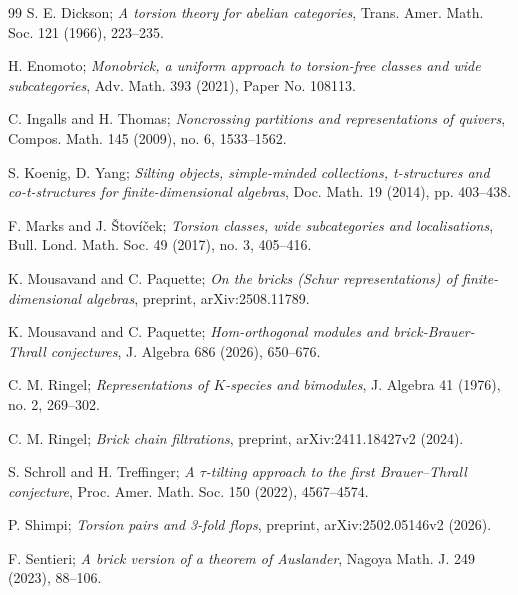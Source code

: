 \documentclass[11pt]{amsart}
\theoremstyle{definition}
\begin{document}
\begin{thebibliography}{99}
S. E. Dickson;
\emph{A torsion theory for abelian categories},
Trans. Amer. Math. Soc. 121 (1966), 223--235.


H. Enomoto;
\emph{Monobrick, a uniform approach to torsion-free classes and wide subcategories},
Adv. Math. 393 (2021), Paper No. 108113.

C. Ingalls and H. Thomas;
\emph{Noncrossing partitions and representations of quivers},
Compos. Math. 145 (2009), no. 6, 1533--1562.

S. Koenig, D. Yang; 
\emph{Silting objects, simple-minded collections, t-structures and co-t-structures for finite-dimensional algebras},
Doc. Math. 19 (2014), pp. 403--438.

F. Marks and J. \v{S}tov\'{i}\v{c}ek;
\emph{Torsion classes, wide subcategories and localisations},
Bull. Lond. Math. Soc. 49 (2017), no. 3, 405--416.

K. Mousavand and C. Paquette;
\emph{On the bricks (Schur representations) of finite-dimensional algebras},
preprint, arXiv:2508.11789.

K. Mousavand and C. Paquette;
\emph{Hom-orthogonal modules and brick-Brauer-Thrall conjectures},
J. Algebra 686 (2026), 650--676.

C. M. Ringel;
\emph{Representations of \(K\)-species and bimodules},
J. Algebra 41 (1976), no. 2, 269--302.

C. M. Ringel;
\emph{Brick chain filtrations},
preprint, arXiv:2411.18427v2 (2024).

S. Schroll and H. Treffinger;
\emph{A \(\tau\)-tilting approach to the first Brauer--Thrall conjecture},
Proc. Amer. Math. Soc. 150 (2022), 4567--4574.

P. Shimpi;
\emph{Torsion pairs and 3-fold flops},
preprint, arXiv:2502.05146v2 (2026).

F. Sentieri;
\emph{A brick version of a theorem of Auslander},
Nagoya Math. J. 249 (2023), 88--106.


\end{thebibliography}
\end{document}
